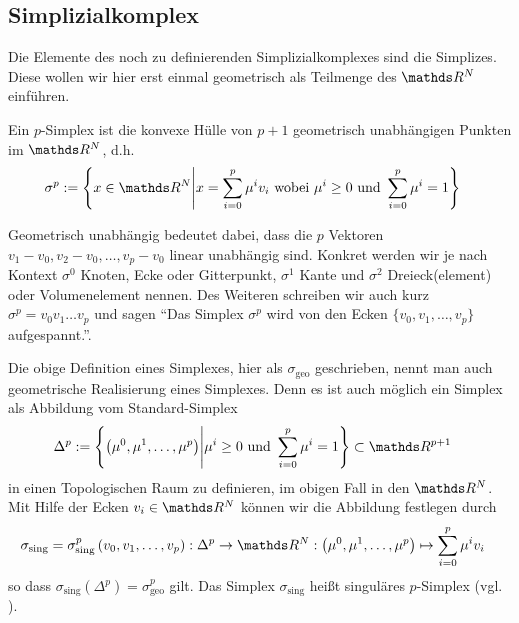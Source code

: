  \subsection{Simplizialkomplex}
    
    Die Elemente des noch zu definierenden Simplizialkomplexes sind die Simplizes.
    Diese wollen wir hier erst einmal geometrisch als Teilmenge des \( \R^{N} \) einführen.

    \begin{definition}
      \label{defSimplex}
      Ein \( p \)-Simplex ist die konvexe Hülle von \( p+1 \) geometrisch unabhängigen Punkten im \( \R^{N} \), d.h.
      \begin{align}
        \sigma^{p} &:= \left\{  x \in \R^{N} \middle| x = \sum_{i=0}^{p}\mu^{i}v_{i} \text{ wobei } \mu^{i} \ge 0  \text{ und } \sum_{i=0}^{p}\mu^{i} = 1 \right\}
      \end{align}
    \end{definition}
    
    Geometrisch unabhängig bedeutet dabei, dass die \( p \) Vektoren \( v_{1} - v_{0}, v_{2} - v_{0},\ldots,  v_{p} - v_{0} \) linear unabhängig sind.
    Konkret werden wir je nach Kontext \( \sigma^{0} \) Knoten, Ecke oder Gitterpunkt, \( \sigma^{1} \) Kante und \( \sigma^{2} \) Dreieck(element) oder Volumenelement nennen.
    Des Weiteren schreiben wir auch kurz \( \sigma^{p} = v_{0} v_{1} \ldots v_{p} \) und sagen 
    "`Das Simplex \( \sigma^{p} \) wird von den Ecken \( \{ v_{0}, v_{1}, \ldots, v_{p}\} \) aufgespannt."'.

    \begin{bemerkung}
      \label{singSimplex}
      \label{refSingSimplex}
      Die obige Definition eines Simplexes, hier als \( \sigma_{\text{geo}} \) geschrieben, nennt man auch geometrische Realisierung eines Simplexes.
      Denn es ist auch möglich ein Simplex als Abbildung vom Standard-Simplex 
        \begin{align} 
          \Delta^{p} &:= \left\{\left( \mu^{0},\mu^{1},\ldots,\mu^{p} \right) \middle| \mu^{i} \ge 0  \text{ und } \sum_{i=0}^{p}\mu^{i} = 1 \right\} \subset
        \R^{p+1} 
        \end{align}
      in einen Topologischen Raum zu definieren, im obigen Fall in den \( \R^{N} \). 
      Mit Hilfe der Ecken \( v_{i}\in\R^{N} \) können wir die Abbildung festlegen durch
      \begin{align}
        \sigma_{\text{sing}} = \sigma^{p}_{\text{sing}}\left( v_{0}, v_{1}, \ldots, v_{p} \right) : \Delta^{p} &\rightarrow \R^{N}
                        : \left( \mu^{0},\mu^{1},\ldots,\mu^{p} \right)\mapsto \sum_{i=0}^{p}\mu^{i}v_{i}
      \end{align}
      so dass \( \sigma_{\text{sing}}(\Delta^{p}) = \sigma^{p}_{\text{geo}} \) gilt.
      Das Simplex \(\sigma_{\text{sing}}\) heißt singuläres \( p \)-Simplex (vgl. \cite{lueck}).
    \end{bemerkung}

